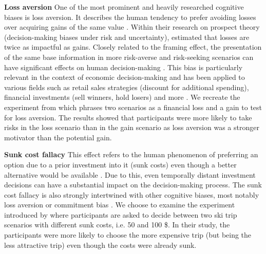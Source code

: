 \par \textbf{Loss aversion} One of the most prominent and heavily researched cognitive biases is loss aversion. It describes the human tendency to prefer avoiding losses over acquiring gains of the same value  \parencite{liu2023review}. Within their research on prospect theory (decision-making biases under risk and uncertainty), \textcite{tversky1992advances} estimated that losses are twice as impactful as gains. Closely related to the framing effect, the presentation of the same base information in more risk-averse and risk-seeking scenarios can have significant effects on human decision-making \parencite{druckman2001evaluating}. This bias is particularly relevant in the context of economic decision-making and has been applied to various fields such as retail sales strategies (discount for additional spending), financial investments (sell winners, hold losers) and more \parencite{liu2023review}. We recreate the experiment from \textcite{thaler2015misbehaving} which phrases two scenarios as a financial loss and a gain to test for loss aversion. The results showed that participants were more likely to take risks in the loss scenario than in the gain scenario as loss aversion was a stronger motivator than the potential gain.

\par \textbf{Sunk cost fallacy} This effect refers to the human phenomenon of preferring an option due to a prior investment into it (sunk costs) even though a better alternative would be available \parencite{arkes1985psychology}. Due to this, even temporally distant investment decisions can have a substantial impact on the decision-making process. The sunk cost fallacy is also strongly intertwined with other cognitive biases, most notably loss aversion or commitment bias \parencite{jarmolowicz2016sunk}. We choose to examine the experiment introduced by \textcite{arkes1985psychology} where participants are asked to decide between two ski trip scenarios with different sunk costs, i.e. 50 and 100 \$. In their study, the participants were more likely to choose the more expensive trip (but being the less attractive trip) even though the costs were already sunk.

